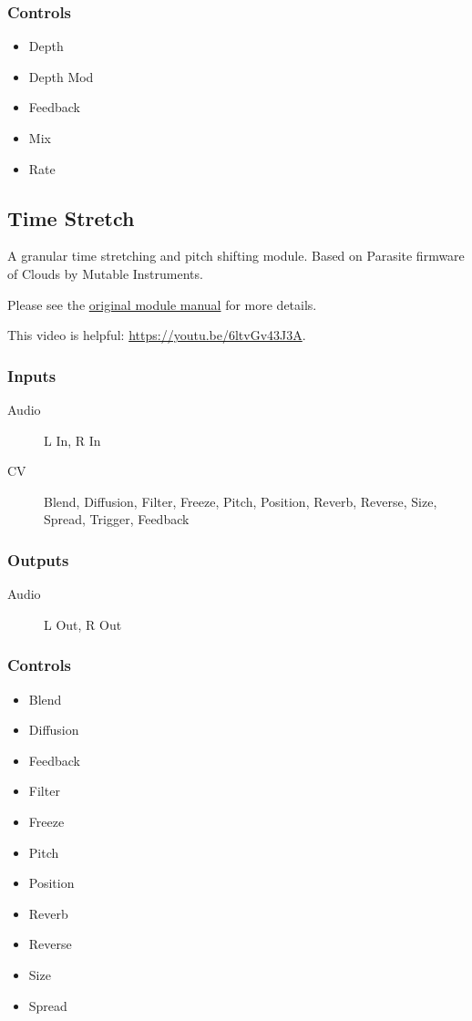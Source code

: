 \subsubsection{Controls}
\begin{itemize}
\item Depth
\item Depth Mod
\item Feedback
\item Mix
\item Rate
\end{itemize}

\subsection{Time Stretch}

A granular time stretching and pitch shifting module. Based on Parasite firmware of Clouds by Mutable Instruments.



Please see the \href{https://mqtthiqs.github.io/parasites/clouds.html}{original module manual} for more details.

This video is helpful: \url{https://youtu.be/6ltvGv43J3A}.

\subsubsection{Inputs}
\begin{description}
\item [Audio] L In, R In
\item [CV] Blend, Diffusion, Filter, Freeze, Pitch, Position, Reverb, Reverse, Size, Spread, Trigger, Feedback
\end{description}

\subsubsection{Outputs}
\begin{description}
\item [Audio] L Out, R Out
\end{description}

\subsubsection{Controls}
\begin{itemize}
\item Blend
\item Diffusion
\item Feedback
\item Filter
\item Freeze
\item Pitch
\item Position
\item Reverb
\item Reverse
\item Size
\item Spread
\end{itemize}

